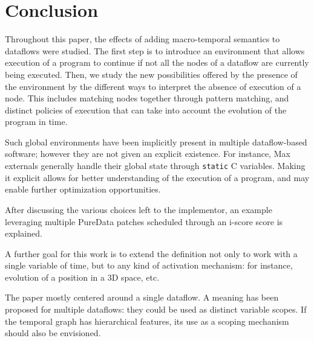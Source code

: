 \documentclass{article}
\begin{document}
\section{Conclusion}
Throughout this paper, the effects of adding macro-temporal semantics to dataflows were studied. 
The first step is to introduce an environment that allows execution of a program to continue if not all the nodes of a dataflow are currently being executed.
Then, we study the new possibilities offered by the presence of the environment by the different ways to interpret the absence of execution of a node.
This includes matching nodes together through pattern matching, and distinct policies of execution that can take into account the evolution of the program in time.

Such global environments have been implicitly present in multiple dataflow-based software; however they are not given an explicit existence. For instance, Max externals generally handle their global state through \lstinline|static| C variables. Making it explicit allows for better understanding of the execution of a program, and may enable further optimization opportunities.

After discussing the various choices left to the implementor, an example leveraging multiple PureData patches scheduled through an i-score score is explained.

A further goal for this work is to extend the definition not only to work with a single variable of time, but to any kind of activation mechanism: for instance, evolution of a position in a 3D space, etc.

The paper mostly centered around a single dataflow. A meaning has been proposed for multiple dataflows: they could be used as distinct variable scopes. If the temporal graph has hierarchical features, its use as a scoping mechanism should also be envisioned.
\printbibliography

    
\end{document}
